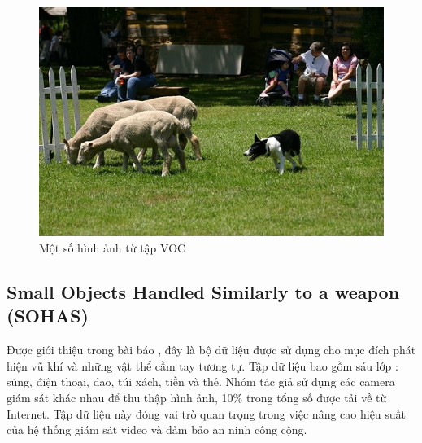 \documentclass[a4paper]{article}
\begin{document}
\begin{figure}[h]
\begin{multicols}{4}
		\includegraphics[width=1.\linewidth]{fig/000654}
	\end{multicols}
	\caption{Một số hình ảnh từ tập VOC}
	\label{exampleonVOC}
\end{figure}

\subsection{\textbf{Small Objects Handled Similarly to a weapon (SOHAS)}}

Được giới thiệu trong bài báo \cite{SOHAS}, đây là bộ dữ liệu được sử dụng cho mục đích phát hiện vũ khí và những vật thể cầm tay tương tự. Tập dữ liệu bao gồm sáu lớp : súng, điện thoại, dao, túi xách, tiền và thẻ. Nhóm tác giả sử dụng các camera giám sát khác nhau để thu thập hình ảnh, 10\% trong tổng số được tải về từ Internet. Tập dữ liệu này đóng vai trò quan trọng trong việc nâng cao hiệu suất của hệ thống giám sát video và đảm bảo an ninh công cộng.
\end{document}
